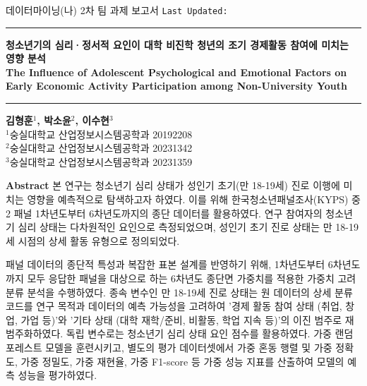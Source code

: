 \begin{center}
  \thispagestyle{empty}

  \noindent 데이터마이닝(나) 2차 팀 과제 보고서 \hfill \small \makeatletter\texttt{Last Updated: \@date}\makeatother \\
  \noindent\rule{\textwidth}{0.5pt}\par

  \vspace{2em}

  \huge \textbf{청소년기의 심리·정서적 요인이 대학 비진학 청년의 조기 경제활동 참여에 미치는 영향 분석} %
  \vspace{0.5em}
  \\
  \large \textbf{The Influence of Adolescent Psychological and Emotional Factors on Early Economic Activity Participation among Non-University Youth}

  \vspace{1em}
  \noindent\rule{\textwidth}{0.5pt}\par

  \vspace{1em}

  \small \textbf{김형훈$^1$, 박소윤$^2$, 이수현$^3$}
  \vspace{0.5em}
  \\
  \small $^1$숭실대학교 산업정보시스템공학과 20192208 \\
  \small $^2$숭실대학교 산업정보시스템공학과 20231342 \\
  \small $^3$숭실대학교 산업정보시스템공학과 20231359

  \vspace{1em}

  \noindent\textbf{Abstract}
  본 연구는 청소년기 심리 상태가 성인기 초기(만 18-19세) 진로 이행에 미치는 영향을 예측적으로 탐색하고자 하였다. 이를 위해 한국청소년패널조사(KYPS) 중2 패널 1차년도부터 6차년도까지의 종단 데이터를 활용하였다. 연구 참여자의 청소년기 심리 상태는 다차원적인 요인으로 측정되었으며, 성인기 초기 진로 상태는 만 18-19세 시점의 상세 활동 유형으로 정의되었다.

  패널 데이터의 종단적 특성과 복잡한 표본 설계를 반영하기 위해, 1차년도부터 6차년도까지 모두 응답한 패널을 대상으로 하는 6차년도 종단면 가중치를 적용한 가중치 고려 분류 분석을 수행하였다. 종속 변수인 만 18-19세 진로 상태는 원 데이터의 상세 분류 코드를 연구 목적과 데이터의 예측 가능성을 고려하여 '경제 활동 참여 상태 (취업, 창업, 가업 등)'와 '기타 상태 (대학 재학/준비, 비활동, 학업 지속 등)'의 이진 범주로 재범주화하였다. 독립 변수로는 청소년기 심리 상태 요인 점수를 활용하였다. 가중 랜덤 포레스트 모델을 훈련시키고, 별도의 평가 데이터셋에서 가중 혼동 행렬 및 가중 정확도, 가중 정밀도, 가중 재현율, 가중 F1-score 등 가중 성능 지표를 산출하여 모델의 예측 성능을 평가하였다.


\end{center}
